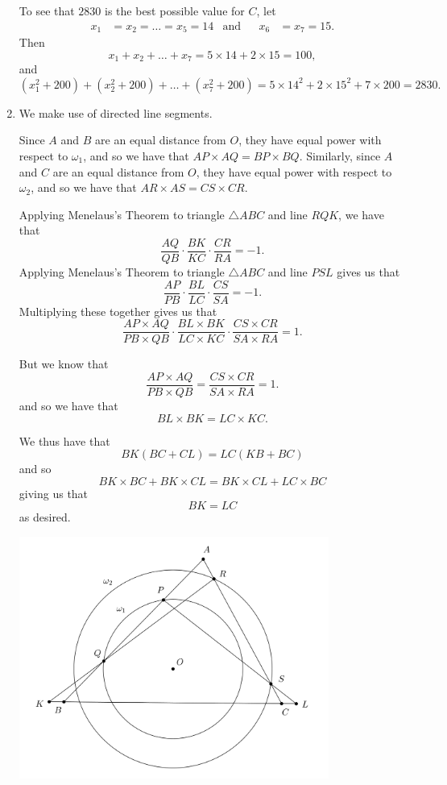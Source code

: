 \documentclass[12pt]{article}
\begin{document}
\begin{enumerate}
To see that $2830$ is the best possible value for $C$, let
\begin{align*}
    x_1 & = x_2 = \dots = x_5 = 14 & \text{and} && x_6 & = x_7 = 15.
\end{align*}
Then 
\[
    x_1 + x_2 + \dots + x_7 = 5 \times 14 + 2 \times 15 = 100,
\]
and
\[
    (x_1^2 + 200) + (x_2^2 + 200) + \dots + (x_7^2 + 200) = 5 \times 14^2 + 2
    \times 15^2 + 7 \times 200 = 2830.
\]


\item %
We make use of directed line segments.

Since $A$ and $B$ are an equal distance from $O$, they have equal power with
respect to $\omega_1$, and so we have that $AP \times AQ = BP \times BQ$.
Similarly, since $A$ and $C$ are an equal distance from $O$, they have equal
power with respect to $\omega_2$, and so we have that $AR \times AS = CS \times
CR$.

Applying Menelaus's Theorem to triangle $\triangle ABC$ and line $RQK$, we have
that
\[
    \frac{AQ}{QB} \cdot \frac{BK}{KC} \cdot \frac{CR}{RA} = -1.
\]
Applying Menelaus's Theorem to triangle $\triangle ABC$ and line $PSL$ gives us
that
\[
    \frac{AP}{PB} \cdot \frac{BL}{LC} \cdot \frac{CS}{SA} = -1.
\]
Multiplying these together gives us that
\[
    \frac{AP \times AQ}{PB \times QB} \cdot \frac{BL \times BK}{LC \times KC}
    \cdot \frac{CS \times CR}{SA \times RA} = 1.
\]

But we know that
\[
    \frac{AP \times AQ}{PB \times QB} = \frac{CS \times CR}{SA \times RA} = 1.
\]
and so we have that
\[
    BL \times BK = LC \times KC.
\]

We thus have that
\[
    BK (BC + CL) = LC (KB + BC)
\]
and so
\[
    BK \times BC + BK \times CL = BK \times CL + LC \times BC
\]
giving us that
\[
    BK = LC
\]
as desired.

\begin{center}
    \includegraphics[width=0.8\textwidth]{february_q7.png}
\end{center}


\end{enumerate}
\end{document}
